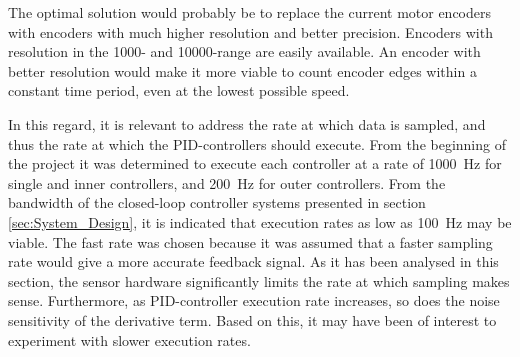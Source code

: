 \documentclass[../../main.tex]{subfiles}
\begin{document}



The optimal solution would probably be to replace the current motor encoders with encoders with much higher resolution and better precision. Encoders with resolution in the 1000- and 10000-range are easily available. An encoder with better resolution would make it more viable to count encoder edges within a constant time period, even at the lowest possible speed.

In this regard, it is relevant to address the rate at which data is sampled, and thus the rate at which the PID-controllers should execute. From the beginning of the project it was determined to execute each controller at a rate of \SI{1000}{\hertz} for single and inner controllers, and \SI{200}{\hertz} for outer controllers. From the bandwidth of the closed-loop controller systems presented in section \ref{sec:System_Design}, it is indicated that execution rates as low as \SI{100}{\hertz} may be viable. The fast rate was chosen because it was assumed that a faster sampling rate would give a more accurate feedback signal. As it has been analysed in this section, the sensor hardware significantly limits the rate at which sampling makes sense. Furthermore, as PID-controller execution rate increases, so does the noise sensitivity of the derivative term. Based on this, it may have been of interest to experiment with slower execution rates.
\end{document}

